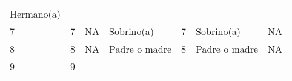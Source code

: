 \documentclass[
]{book}
\begin{document}
\begin{longtable}[]{@{}lllllll@{}}
\begin{minipage}[t]{0.16\columnwidth}
Hermano(a)\strut
\end{minipage}\tabularnewline
\begin{minipage}[t]{0.10\columnwidth}\raggedright
7\strut
\end{minipage} & \begin{minipage}[t]{0.07\columnwidth}\raggedright
7\strut
\end{minipage} & \begin{minipage}[t]{0.07\columnwidth}\raggedright
NA\strut
\end{minipage} & \begin{minipage}[t]{0.16\columnwidth}\raggedright
Sobrino(a)\strut
\end{minipage} & \begin{minipage}[t]{0.09\columnwidth}\raggedright
7\strut
\end{minipage} & \begin{minipage}[t]{0.16\columnwidth}\raggedright
Sobrino(a)\strut
\end{minipage} & \begin{minipage}[t]{0.16\columnwidth}\raggedright
NA\strut
\end{minipage}\tabularnewline
\begin{minipage}[t]{0.10\columnwidth}\raggedright
8\strut
\end{minipage} & \begin{minipage}[t]{0.07\columnwidth}\raggedright
8\strut
\end{minipage} & \begin{minipage}[t]{0.07\columnwidth}\raggedright
NA\strut
\end{minipage} & \begin{minipage}[t]{0.16\columnwidth}\raggedright
Padre o madre\strut
\end{minipage} & \begin{minipage}[t]{0.09\columnwidth}\raggedright
8\strut
\end{minipage} & \begin{minipage}[t]{0.16\columnwidth}\raggedright
Padre o madre\strut
\end{minipage} & \begin{minipage}[t]{0.16\columnwidth}\raggedright
NA\strut
\end{minipage}\tabularnewline
\begin{minipage}[t]{0.10\columnwidth}\raggedright
9\strut
\end{minipage} & \begin{minipage}[t]{0.07\columnwidth}\raggedright
9\strut
\end{minipage} & \begin{minipage}[t]{0.07\columnwidth}\raggedright

\end{minipage}
\end{longtable}
\end{document}
